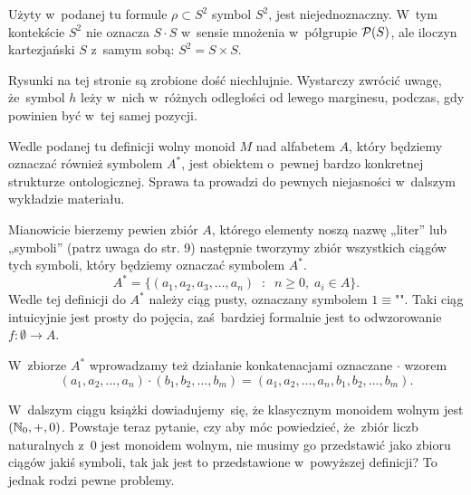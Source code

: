 \documentclass[a4paper,11pt]{article}
\begin{document}
\start {} Użyty w~podanej tu formule $\rho \subset S^{ 2 }$ symbol
$S^{ 2 }$, jest niejednoznaczny. W~tym kontekście $S^{ 2 }$ nie oznacza
$S \cdot S$ w~sensie mnożenia w~półgrupie $\mathcal{P}( S )$, ale iloczyn kartezjański
$S$ z~samym sobą: $S^{ 2 } = S \times S$.

\vspace{\spaceFour}





\start {} Rysunki na tej stronie są zrobione dość niechlujnie.
Wystarczy zwrócić uwagę, że~symbol $h$ leży w~nich w~różnych odległości od
lewego marginesu, podczas, gdy powinien być w~tej samej pozycji.

\vspace{\spaceFour}





\start {} Wedle podanej tu definicji wolny monoid $M$ nad
alfabetem $A$, który będziemy oznaczać również symbolem $A^{ * }$,
jest obiektem o~pewnej bardzo konkretnej strukturze ontologicznej.
Sprawa ta prowadzi do pewnych niejasności w~dalszym wykładzie
materiału.

Mianowicie bierzemy pewien zbiór $A$, którego elementy noszą nazwę
„liter” lub „symboli” (patrz uwaga do str. 9) następnie tworzymy zbiór
wszystkich ciągów tych symboli, który będziemy oznaczać symbolem
$A^{ * }$.
\begin{equation}
  \label{eq:Forys-Forys-03}
  A^{ * } =
  \{ ( a_{ 1 }, a_{ 2 }, a_{ 3 }, \ldots, a_{ n } ) \;\; : \;\; n \geq 0, \;
  a_{ i } \in A \}.
\end{equation}
Wedle tej definicji do $A^{ * }$ należy ciąg pusty, oznaczany symbolem
$1 \equiv \texttt{""}$. Taki ciąg intuicyjnie jest prosty do pojęcia,
zaś~bardziej formalnie jest to odwzorowanie $f : \emptyset \to A$.

W~zbiorze $A^{ * }$ wprowadzamy też działanie konkatenacjami oznaczane $\cdot$
wzorem
\begin{equation}
  \label{eq:Froys-Forys-04}
  ( a_{ 1 }, a_{ 2 }, \ldots, a_{ n } ) \cdot ( b_{ 1 }, b_{ 2 }, \ldots, b_{ m } ) =
  ( a_{ 1 }, a_{ 2 }, \ldots, a_{ n }, b_{ 1 }, b_{ 2 }, \ldots, b_{ m } ).
\end{equation}

W~dalszym ciągu książki dowiadujemy~się, że klasycznym monoidem wolnym
jest $( \mathbb{N}_{ 0 }, +, 0 )$. Powstaje teraz pytanie, czy aby móc
powiedzieć, że~zbiór liczb naturalnych z~$0$ jest monoidem wolnym, nie
musimy go przedstawić jako zbioru ciągów jakiś symboli, tak jak jest
to przedstawione w~powyższej definicji? To jednak rodzi pewne
problemy.
\end{document}
